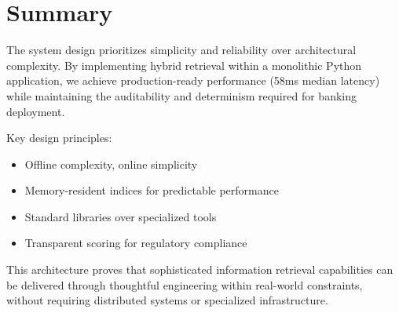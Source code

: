 \section{Summary}

The system design prioritizes simplicity and reliability over architectural complexity. By implementing hybrid retrieval within a monolithic Python application, we achieve production-ready performance (58ms median latency) while maintaining the auditability and determinism required for banking deployment.

Key design principles:

\begin{itemize}[leftmargin=*,itemsep=2pt,topsep=2pt]
  \item Offline complexity, online simplicity
  \item Memory-resident indices for predictable performance
  \item Standard libraries over specialized tools
  \item Transparent scoring for regulatory compliance
\end{itemize}

This architecture proves that sophisticated information retrieval capabilities can be delivered through thoughtful engineering within real-world constraints, without requiring distributed systems or specialized infrastructure.
